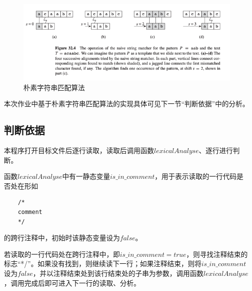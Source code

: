 \documentclass[11pt]{homework}
\begin{document}
  \begin{figure}
    \centering
    \includegraphics[width=\textwidth]{naive-matching-algorithm}
    \caption{朴素字符串匹配算法}
    \label{naive-matching-algorithm}
  \end{figure}

  本次作业中基于朴素字符串匹配算法的实现具体可见下一节“判断依据”中的分析。

  \subsection*{判断依据}

  本程序打开目标文件后逐行读取，读取后调用函数$lexicalAnalyse$、逐行进行判断。

  函数$lexicalAnalyse$中有一静态变量$is\_in\_comment$，用于表示读取的一行代码是否处在形如
  \lstset{language=c++}
  \begin{lstlisting}
    /*
    comment
    */
  \end{lstlisting}
  的跨行注释中，初始时该静态变量设为$false$。

  若读取的一行代码处在跨行注释中，即$is\_in\_comment = true$，则寻找注释结束的标志“*/”。如果没有找到，则继续读下一行；如果注释结束，则将$is\_in\_comment$设为$false$，并以注释结束处到该行结束处的子串为参数，调用函数$lexicalAnalyse$，调用完成后即可进入下一行的读取、分析。
\end{document}
